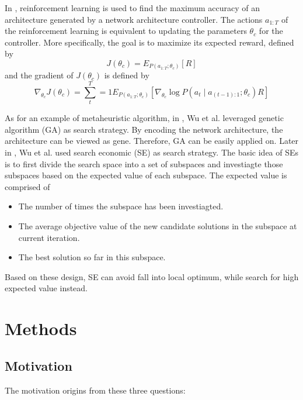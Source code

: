 \documentclass[sigconf]{acmart}
\begin{document}
    In \cite{zoph2017neural}, reinforcement learning is used to find the maximum accuracy of an architecture 
    generated by a network architecture controller. The actions $a_{1:T}$ of the reinforcement learning is 
    equivalent to updating the parameters $\theta_c$ for the controller. More specifically, the goal is to maximize 
    its expected reward, defined by 
    \begin{equation}
        \label{equ:reinforcement_rw}
        J(\theta_c)=E_{P(a_{1:T};\theta_c)}[R]
    \end{equation}
    and the gradient of $J(\theta_c)$ is defined by
    \begin{equation}
        \label{equ:reinforcement_grad}
        \nabla_{\theta_c} J(\theta_c)=\sum^T_t=1 E_{P(a_{1:T};\theta_c)}[\nabla_{\theta_c}\log P(a_t\mid a_{(t-1):1};\theta_c)R]
    \end{equation}

    As for an example of metaheuristic algorithm, in \cite{10.1145/3491396.3506510}, Wu et al. leveraged 
    genetic algorithm (GA) as search strategy. 
    By encoding the network architecture, the architecture can be viewed as gene. Therefore, GA can be 
    easily applied on. 
    Later in \cite{10092788}, Wu et al. used search economic (SE) \cite{7379579} as search strategy. The 
    basic idea of SEs is to first divide the search space into a set of subspaces and investiagte those 
    subspaces based on the expected value of each subspace. The expected value is comprised of 
    \begin{itemize}
        \item The number of times the subspace has been investiagted. 
        \item The average objective value of the new candidate solutions in the subspace at current iteration. 
        \item The best solution so far in this subspace. 
    \end{itemize}
    Based on these design, SE can avoid fall into local optimum, while search for high expected value instead. 
    
    \section{Methods}
    \label{sec:proposed}
    \subsection{Motivation}
    The motivation origins from these three questions: 
\end{document}
